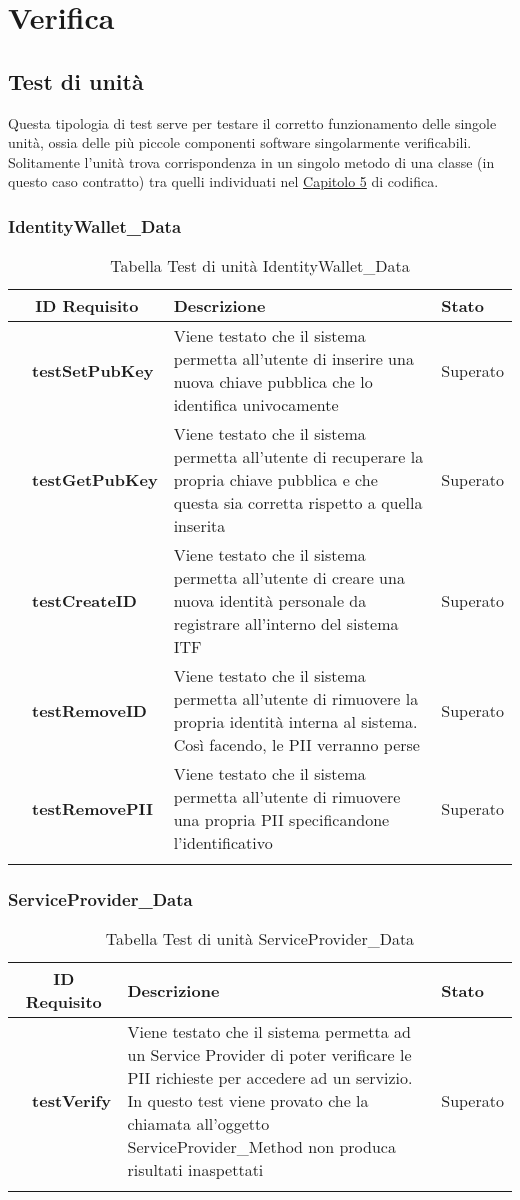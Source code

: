 \section{Verifica}
\subsection{Test di unità}
Questa tipologia di test serve per testare il corretto funzionamento delle singole unità, ossia delle più piccole componenti software singolarmente verificabili.\\
Solitamente l'unità trova corrispondenza in un singolo metodo di una classe (in questo caso contratto) tra quelli individuati nel \hyperref[cap:codifica]{Capitolo 5} di codifica.
\subsubsection{IdentityWallet\_Data}
\begin{longtable}{|r l|p{10cm}|p{2cm}|}
	\hline
	\multicolumn{2}{|c|}{\textbf{ID Requisito}} & \textbf{Descrizione} & \textbf{Stato}\tabularnewline
	\hline
	&\textbf{testSetPubKey}&Viene testato che il sistema permetta all'utente di inserire una nuova chiave pubblica che lo identifica univocamente& Superato\\\hline
	&\textbf{testGetPubKey}&Viene testato che il sistema permetta all'utente di recuperare la propria chiave pubblica e che questa sia corretta rispetto a quella inserita& Superato\\\hline
	&\textbf{testCreateID}&Viene testato che il sistema permetta all'utente di creare una nuova identità personale da registrare all'interno del sistema \gls{ITF}& Superato\\\hline
	&\textbf{testRemoveID}&Viene testato che il sistema permetta all'utente di rimuovere la propria identità interna al sistema. Così facendo, le \gls{PII} verranno perse& Superato\\\hline
	&\textbf{testRemovePII}&Viene testato che il sistema permetta all'utente di rimuovere una propria \gls{PII} specificandone l'identificativo& Superato\\\hline
	\caption{Tabella Test di unità IdentityWallet\_Data}
\end{longtable}
\subsubsection{ServiceProvider\_Data}
\begin{longtable}{|r l|p{10cm}|p{2cm}|}
	\hline
	\multicolumn{2}{|c|}{\textbf{ID Requisito}} & \textbf{Descrizione} & \textbf{Stato}\tabularnewline
	\hline
	&\textbf{testVerify}&Viene testato che il sistema permetta ad un Service Provider di poter verificare le \gls{PII} richieste per accedere ad un servizio. In questo test viene provato che la chiamata all'oggetto ServiceProvider\_Method non produca risultati inaspettati & Superato\\\hline
	\caption{Tabella Test di unità ServiceProvider\_Data}
\end{longtable}

